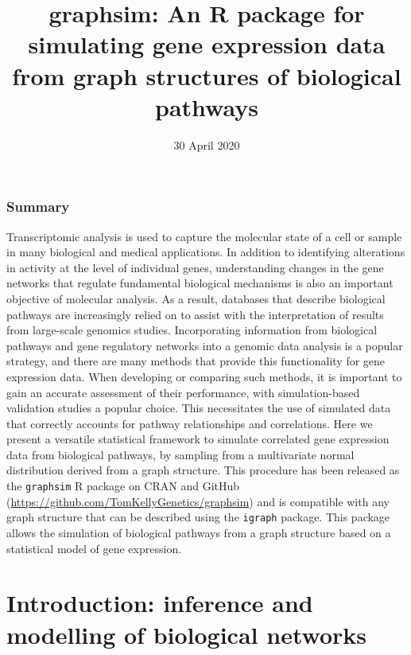 \documentclass[]{article}
\title{graphsim: An R package for simulating gene expression data from graph
structures of biological pathways}
\author{}
\date{\vspace{-2.5em}30 April 2020}
\begin{document}
\maketitle

\hypertarget{summary}{%
\subsubsection{Summary}\label{summary}}

Transcriptomic analysis is used to capture the molecular state of a cell
or sample in many biological and medical applications. In addition to
identifying alterations in activity at the level of individual genes,
understanding changes in the gene networks that regulate fundamental
biological mechanisms is also an important objective of molecular
analysis. As a result, databases that describe biological pathways are
increasingly relied on to assist with the interpretation of results from
large-scale genomics studies. Incorporating information from biological
pathways and gene regulatory networks into a genomic data analysis is a
popular strategy, and there are many methods that provide this
functionality for gene expression data. When developing or comparing
such methods, it is important to gain an accurate assessment of their
performance, with simulation-based validation studies a popular choice.
This necessitates the use of simulated data that correctly accounts for
pathway relationships and correlations. Here we present a versatile
statistical framework to simulate correlated gene expression data from
biological pathways, by sampling from a multivariate normal distribution
derived from a graph structure. This procedure has been released as the
\texttt{graphsim} R package on CRAN and GitHub
(\url{https://github.com/TomKellyGenetics/graphsim}) and is compatible
with any graph structure that can be described using the \texttt{igraph}
package. This package allows the simulation of biological pathways from
a graph structure based on a statistical model of gene expression.

\hypertarget{sec:intro}{%
\section{Introduction: inference and modelling of biological
networks}\label{sec:intro}}
\end{document}

